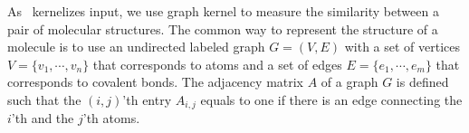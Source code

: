 {

As \mmcrf\ kernelizes input, we use graph kernel to measure the similarity between a pair of molecular structures.
The common way to represent the structure of a molecule is to use an undirected labeled graph $G=(V,E)$ with a set of vertices $V=\{v_1,\cdots,v_n\}$ that corresponds to atoms and a set of edges $E=\{e_1,\cdots,e_m\}$ that corresponds to covalent bonds.
The adjacency matrix $A$ of a graph $G$ is defined such that the $(i,j)$'th entry $A_{i,j}$ equals to one if there is an edge connecting the $i$'th and the $j$'th atoms.

}
